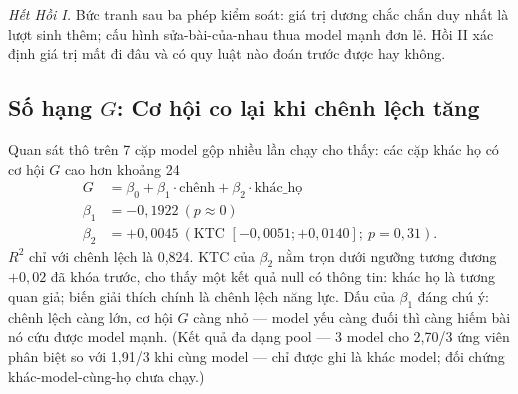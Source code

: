 \documentclass[12pt,a4paper]{article}
\begin{document}
\textit{Hết Hồi I.} Bức tranh sau ba phép kiểm soát: giá trị dương chắc chắn duy nhất là lượt sinh thêm; cấu hình sửa-bài-của-nhau thua model mạnh đơn lẻ. Hồi II xác định giá trị mất đi đâu và có quy luật nào đoán trước được hay không.

\subsection{Số hạng \(G\): Cơ hội co lại khi chênh lệch tăng}\label{sec:termG}

Quan sát thô trên 7 cặp model gộp nhiều lần chạy cho thấy: các cặp khác họ có cơ hội \(G\) cao hơn khoảng 24%
\begin{align*}
G &= \beta_0 + \beta_1\cdot\text{chênh} + \beta_2\cdot\text{khác\_họ}\\
\beta_1 &= -0{,}1922\ (p \approx 0)\\
\beta_2 &= +0{,}0045\ (\text{KTC } [-0{,}0051;+0{,}0140];\ p = 0{,}31).
\end{align*}
\(R^2\) chỉ với chênh lệch là 0,824. KTC của \(\beta_2\) nằm trọn dưới ngưỡng tương đương \(+0{,}02\) đã khóa trước, cho thấy một kết quả null có thông tin: khác họ là tương quan giả; biến giải thích chính là chênh lệch năng lực. Dấu của \(\beta_1\) đáng chú ý: chênh lệch càng lớn, cơ hội \(G\) càng nhỏ --- model yếu càng đuối thì càng hiếm bài nó cứu được model mạnh. (Kết quả đa dạng pool --- 3 model cho 2,70/3 ứng viên phân biệt so với 1,91/3 khi cùng model --- chỉ được ghi là khác model; đối chứng khác-model-cùng-họ chưa chạy.)
\end{document}
